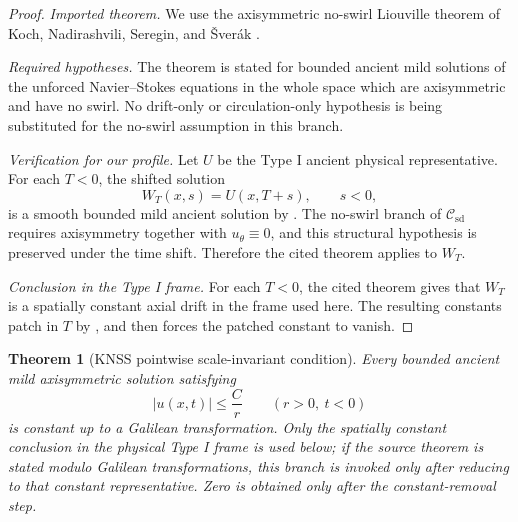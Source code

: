 \documentclass[11pt]{amsart}
\theoremstyle{plain}
\newtheorem{theorem}{Theorem}[section]
\theoremstyle{definition}
\theoremstyle{remark}
\numberwithin{equation}{section}
\newcommand{\calC}{\mathcal C}
\begin{document}
\begin{proof}
\smallskip
\noindent\emph{Imported theorem.}
We use the axisymmetric no-swirl Liouville theorem of
Koch, Nadirashvili, Seregin, and \v{S}ver\'ak
\cite[Theorem 5.2]{KNSS2009}.

\smallskip
\noindent\emph{Required hypotheses.}
The theorem is stated for bounded ancient mild solutions of the unforced
Navier--Stokes equations in the whole space which are axisymmetric and have no
swirl.  No drift-only or circulation-only hypothesis is being substituted for
the no-swirl assumption in this branch.

\smallskip
\noindent\emph{Verification for our profile.}
Let \(U\) be the Type I ancient physical representative.  For each \(T<0\),
the shifted solution
\[
   W_T(x,s)=U(x,T+s),\qquad s<0,
\]
is a smooth bounded mild ancient solution by .  The
no-swirl branch of \(\calC_{\mathrm{sd}}\) requires axisymmetry together with
\(u_\theta\equiv0\), and this structural hypothesis is preserved under the
time shift.  Therefore the cited theorem applies to \(W_T\).

\smallskip
\noindent\emph{Conclusion in the Type I frame.}
For each \(T<0\), the cited theorem gives that \(W_T\) is a spatially
constant axial drift in the frame used here.  The resulting constants patch in
\(T\) by
, and  then
forces the patched constant to vanish.
\end{proof}

\begin{theorem}[KNSS pointwise scale-invariant condition]
\label{p3:thm:knss-pointwise}
Every bounded ancient mild axisymmetric solution satisfying
\[
   |u(x,t)|\le \frac{C}{r}
   \qquad(r>0,\ t<0)
\]
is constant up to a Galilean transformation.  Only the spatially constant
conclusion in the physical Type I frame is used below; if the source theorem is
stated modulo Galilean transformations, this branch is invoked only after
reducing to that constant representative.  Zero is obtained only after the
constant-removal step.
\end{theorem}
\end{document}
